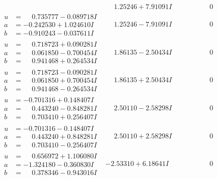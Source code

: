 \documentclass[1p]{elsarticle_modified}
\theoremstyle{definition}
\begin{document}
$$\begin{array}{c|c|c}
 & \phantom{-}1.25246 + 7.91091 I & \phantom{-0.000000 } 0 \\ \hline\begin{aligned}
u &= \phantom{-}0.735777 - 0.089718 I \\
a &= -0.242530 + 1.024610 I \\
b &= -0.910243 - 0.037611 I\end{aligned}
 & \phantom{-}1.25246 - 7.91091 I & \phantom{-0.000000 } 0 \\ \hline\begin{aligned}
u &= \phantom{-}0.718723 + 0.090281 I \\
a &= \phantom{-}0.061850 - 0.700454 I \\
b &= \phantom{-}0.941468 + 0.264534 I\end{aligned}
 & \phantom{-}1.86135 - 2.50434 I & \phantom{-0.000000 } 0 \\ \hline\begin{aligned}
u &= \phantom{-}0.718723 - 0.090281 I \\
a &= \phantom{-}0.061850 + 0.700454 I \\
b &= \phantom{-}0.941468 - 0.264534 I\end{aligned}
 & \phantom{-}1.86135 + 2.50434 I & \phantom{-0.000000 } 0 \\ \hline\begin{aligned}
u &= -0.701316 + 0.148407 I \\
a &= \phantom{-}0.443240 - 0.848281 I \\
b &= \phantom{-}0.703410 + 0.256407 I\end{aligned}
 & \phantom{-}2.50110 - 2.58298 I & \phantom{-0.000000 } 0 \\ \hline\begin{aligned}
u &= -0.701316 - 0.148407 I \\
a &= \phantom{-}0.443240 + 0.848281 I \\
b &= \phantom{-}0.703410 - 0.256407 I\end{aligned}
 & \phantom{-}2.50110 + 2.58298 I & \phantom{-0.000000 } 0 \\ \hline\begin{aligned}
u &= \phantom{-}0.656972 + 1.106080 I \\
a &= -1.324180 - 0.360830 I \\
b &= \phantom{-}0.378346 - 0.943016 I\end{aligned}
 & -2.53310 + 6.18641 I & \phantom{-0.000000 } 0 \\ \hline\begin{aligned}

\end{aligned}
\end{array}$$
\end{document}
